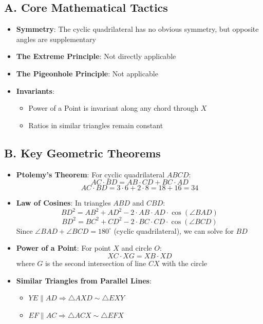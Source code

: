 \documentclass[]{article}
\begin{document}
\begin{tacticalbox}
\subsection*{A. Core Mathematical Tactics}
\begin{itemize}[leftmargin=*]
    \item \textbf{Symmetry}: The cyclic quadrilateral has no obvious symmetry, but opposite angles are supplementary
    
    \item \textbf{The Extreme Principle}: Not directly applicable
    
    \item \textbf{The Pigeonhole Principle}: Not applicable
    
    \item \textbf{Invariants}: 
    \begin{itemize}
        \item Power of a Point is invariant along any chord through $X$
        \item Ratios in similar triangles remain constant
    \end{itemize}
\end{itemize}

\subsection*{B. Key Geometric Theorems}
\begin{itemize}[leftmargin=*]
    \item \textbf{Ptolemy's Theorem}: For cyclic quadrilateral $ABCD$:
    \[AC \cdot BD = AB \cdot CD + BC \cdot AD\]
    \[AC \cdot BD = 3 \cdot 6 + 2 \cdot 8 = 18 + 16 = 34\]
    
    \item \textbf{Law of Cosines}: In triangles $ABD$ and $CBD$:
    \[BD^2 = AB^2 + AD^2 - 2 \cdot AB \cdot AD \cdot \cos(\angle BAD)\]
    \[BD^2 = BC^2 + CD^2 - 2 \cdot BC \cdot CD \cdot \cos(\angle BCD)\]
    Since $\angle BAD + \angle BCD = 180^\circ$ (cyclic quadrilateral), we can solve for $BD$
    
    \item \textbf{Power of a Point}: For point $X$ and circle $O$:
    \[XC \cdot XG = XB \cdot XD\]
    where $G$ is the second intersection of line $CX$ with the circle
    
    \item \textbf{Similar Triangles from Parallel Lines}:
    \begin{itemize}
        \item $YE \parallel AD \Rightarrow \triangle AXD \sim \triangle EXY$
        \item $EF \parallel AC \Rightarrow \triangle ACX \sim \triangle EFX$
    \end{itemize}
\end{itemize}
\end{tacticalbox}
\end{document}
